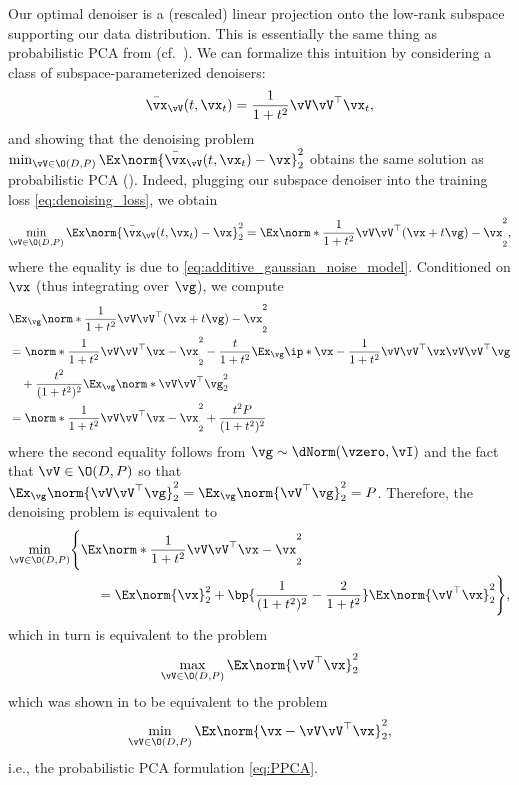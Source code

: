 \documentclass[../../book-main.tex]{subfiles}
\begin{document}
Our optimal denoiser is a (rescaled) linear projection onto the
low-rank subspace supporting our data distribution. This is
essentially the same thing as probabilistic PCA from
 (cf.~). We can
formalize this intuition by considering a class of
subspace-parameterized denoisers:
\begin{equation}\label{eq:optimal nn}
    \bar{\vx}_{\vV}(t, \vx_{t}) = \frac{1}{1 + t^{2}}\vV\vV^{\top}\vx_{t},
\end{equation}
and showing that the denoising problem \(\min_{\vV \in \O(D,
    P)}\Ex\norm{\bar{\vx}_{\vV}(t, \vx_{t}) -
\vx}_{2}^{2}\) obtains the same solution as probabilistic PCA
(). Indeed, plugging our subspace
denoiser into the training loss \eqref{eq:denoising_loss}, we obtain
\begin{equation}
    \min_{\vV \in \O(D, P)}\Ex\norm{\bar{\vx}_{\vV}(t,
    \vx_{t}) - \vx}_{2}^{2} = \Ex\norm*{\frac{1}{1 +
    t^{2}}\vV\vV^{\top}(\vx + t\vg) - \vx}_{2}^{2},
\end{equation}
where the equality is due to
\eqref{eq:additive_gaussian_noise_model}. Conditioned on \(\vx\)
(thus integrating over \(\vg\)), we compute
\begin{align}
    & \Ex_{\vg}\norm*{\frac{1}{1 + t^{2}}\vV\vV^{\top}(\vx + t\vg) -
    \vx}_{2}^{2} \\
    &= \norm*{\frac{1}{1 + t^{2}}\vV\vV^{\top}\vx - \vx}_{2}^{2} -
    \frac{t}{1+t^2}\Ex_{\vg} \ip*{\vx - \frac{1}{1 +
    t^{2}}\vV\vV^{\top}\vx}{\vV\vV^{\top}\vg} \\
    &\quad + \frac{t^2}{(1+t^2)^2} \Ex_{\vg}\norm*{\vV\vV^{\top} \vg}_{2}^{2} \\
    &= \norm*{\frac{1}{1 + t^{2}}\vV\vV^{\top}\vx - \vx}_{2}^{2} +
    \frac{t^2P}{(1+t^2)^2}
\end{align}
where the second equality follows from \(\vg \sim \dNorm(\vzero,
\vI)\) and the fact that \(\vV \in \O(D, P)\) so that \(
    \Ex_{\vg}\norm{\vV\vV^\top
    \vg}_{2}^{2} =
\Ex_{\vg}\norm{\vV^\top \vg}_{2}^{2} = P\). Therefore, the denoising
problem is equivalent to
\begin{align}
    \min_{\vV \in \O(D, P)} & \Bigg\{\Ex \norm*{\frac{1}{1 +
        t^{2}}\vV\vV^{\top}\vx - \vx}_{2}^{2} \\
        & \qquad = \Ex\norm{\vx}_{2}^{2} + \bp{\frac{1}{(1 +
            t^{2})^{2}} - \frac{2}{1 +
    t^{2}}}\Ex\norm{\vV^{\top}\vx}_{2}^{2}\Bigg\},
\end{align}
which in turn is equivalent to the problem
\begin{equation}\label{eq:PCA}
    \max_{\vV \in \O(D, P)}\Ex\norm{\vV^{\top}\vx}_{2}^{2}
\end{equation}
which was shown in  to be equivalent to the problem
\begin{equation}
    \min_{\vV \in \O(D, P)}\Ex\norm{\vx - \vV\vV^{\top}\vx}_{2}^{2},
\end{equation}
i.e., the probabilistic PCA formulation \eqref{eq:PPCA}.
\end{document}
